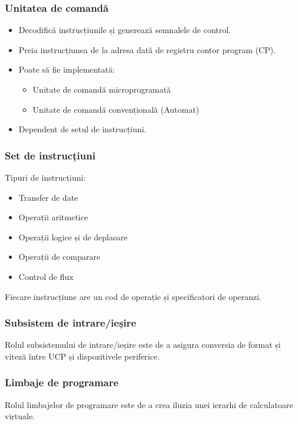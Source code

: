 \begin{frame}
    \frametitle{Unitatea de comandă}
    \begin{itemize}
        \item Decodifică instrucțiunile și generează semnalele de control.
        \item Preia instrucțiunea de la adresa dată de registru contor program (CP).
        \item Poate să fie implementată:
        \begin{itemize}
            \item Unitate de comandă microprogramată
            \item Unitate de comandă convențională (Automat)
        \end{itemize}
        \item Dependent de setul de instrucțiuni.
    \end{itemize}
\end{frame}

\begin{frame}
    \frametitle{Set de instrucțiuni}
    Tipuri de instrucțiuni:
    \begin{itemize}
        \item Transfer de date
        \item Operații aritmetice
        \item Operații logice și de deplasare
        \item Operații de comparare
        \item Control de flux
    \end{itemize}
    Fiecare instrucțiune are un cod de operație și specificatori de operanzi.
\end{frame}

\begin{frame}
    \frametitle{Subsistem de intrare/ieșire}
    Rolul subsistemului de intrare/ieșire este de a asigura conversia de format și viteză între UCP și dispozitivele periferice.
\end{frame}

\begin{frame}
    \frametitle{Limbaje de programare}
    \newsavebox{\asciiplcomp}
    \begin{lrbox}{\asciiplcomp}
        \begin{varwidth}{\maxdimen}
        \end{varwidth}
    \end{lrbox}%

    \begin{figure}[h]
        \centering
        \scalebox{0.8}{\usebox{\asciiplcomp}}
    \end{figure}
    Rolul limbajelor de programare este de a crea iluzia unei ierarhi de calculatoare virtuale.
\end{frame}